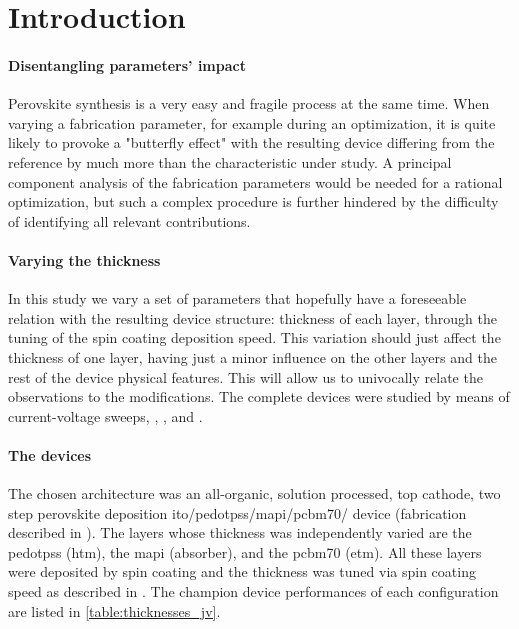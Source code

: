 

\section{Introduction}

	\paragraph{Disentangling parameters' impact}
	Perovskite synthesis is a very easy and fragile process at the same time. When varying a fabrication parameter, for example during an optimization, it is quite likely to provoke a "butterfly effect" with the resulting device differing from the reference by much more than the characteristic under study.
	A principal component analysis of the fabrication parameters would be needed for a rational optimization, but such a complex procedure is further hindered by the difficulty of identifying all relevant contributions.

	\paragraph{Varying the thickness}
	In this study we vary a set of parameters that hopefully have a foreseeable relation with the resulting device structure: thickness of each layer, through the tuning of the spin coating deposition speed.
	This variation should just affect the thickness of one layer, having just a minor influence on the other layers and the rest of the device physical features.
	This will allow us to univocally relate the observations to the modifications.
	The complete devices were studied by means of current-voltage sweeps, , , and .

	\paragraph{The devices}
	The chosen architecture was an all-organic, solution processed, top cathode, two step perovskite deposition \gls{ito}\-/\gls{pedotpss}\-/\gls{mapi}\-/\gls{pcbm70}\-/ device (fabrication described in ).
	The layers whose thickness was independently varied are the \gls{pedotpss} (\gls{htm}), the \gls{mapi} (absorber), and the \gls{pcbm70} (\gls{etm}).
All these layers were deposited by spin coating and the thickness was tuned via spin coating speed as described in .
The champion device performances of each configuration are listed in \cref{table:thicknesses_jv}.


